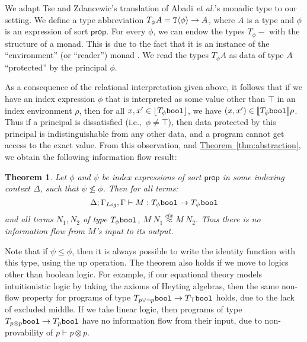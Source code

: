\documentclass{sigplanconf}
\newcommand{\tyPrim}[2]{\textup{\texttt{#1}}\langle #2 \rangle}
\newcommand{\tyPrimNm}[1]{\textup{\texttt{#1}}}
\newcommand{\tySem}[1]{\left\lfloor #1 \right\rfloor}
\newcommand{\rsem}[1]{\llbracket #1 \rrbracket}
\newtheorem{theorem}{Theorem}
\newcommand{\thmref}[1]{\hyperref[#1]{Theorem~\ref*{#1}}}
\theoremstyle{examplestyle}
\theoremstyle{restatementstyle}
\begin{document}
We adapt Tse and Zdancewic's translation of Abadi \emph{et al.}'s monadic
type to our setting. We define a type abbreviation $T_\phi A =
\tyPrim{T}{\phi} \to A$, where $A$ is a type and $\phi$ is an
expression of sort $\mathsf{prop}$. For every $\phi$, we can endow the
types $T_\phi-$ with the structure of a monad. This is due to the fact
that it is an instance of the ``environment'' (or ``reader'') monad
\cite{jones95functional}. We read the types $T_\phi A$ as data of type
$A$ ``protected'' by the principal $\phi$.

As a consequence of the relational interpretation given above, it
follows that if we have an index expression $\phi$ that is interpreted
as some value other than $\top$ in an index environment $\rho$,
then for all $x,x' \in \tySem{T_\phi\tyPrimNm{bool}}$, we have $(x,x')
\in \rsem{T_\phi\tyPrimNm{bool}}{\rho}$. Thus if a principal is
dissatisfied (i.e.,~$\phi \not= \top$), then data protected by this
principal is indistinguishable from any other data, and a program
cannot get access to the exact value. From this observation, and
\thmref{thm:abstraction}, we obtain the following information flow
result:

\begin{theorem}
  Let $\phi$ and $\psi$ be index expressions of sort $\mathsf{prop}$
  in some indexing context $\Delta$, such that $\psi \not\leq
  \phi$. Then for all terms:
  \begin{displaymath}
    \Delta; \Gamma_\infoflow,\Gamma \vdash M : T_\phi\tyPrimNm{bool} \to T_\psi\tyPrimNm{bool}
  \end{displaymath}
  and all terms $N_1,N_2$ of type $T_\phi\tyPrimNm{bool}$, $M\ N_1
  \stackrel{ctx}\approx M\ N_2$.  Thus there is no information flow
  from $M$'s input to its output.
\end{theorem}
Note that if $\psi \leq \phi$, then it is always possible to write the
identity function with this type, using the $\mathrm{up}$ operation.
The theorem also holds if we move to logics other than boolean
logic. For example, if our equational theory models intuitionistic
logic by taking the axioms of Heyting algebras, then the same non-flow
property for programs of type $T_{p\lor\lnot p}\tyPrimNm{bool} \to
T_\top\tyPrimNm{bool}$ holds, due to the lack of excluded middle. If
we take linear logic, then programs of type $T_{p\otimes
  p}\tyPrimNm{bool} \to T_p\tyPrimNm{bool}$ have no information flow
from their input, due to non-provability of $p \vdash p \otimes p$.


\end{document}
